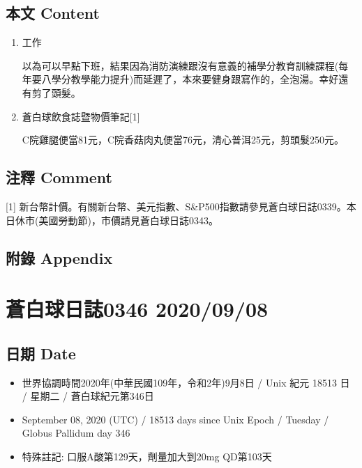 \documentclass[a5paper, 11pt
]{book}
\providecommand{\tightlist}{%
  \setlength{\itemsep}{0pt}\setlength{\parskip}{0pt}}
\begin{document}
\hypertarget{ux672cux6587-content-6}{%
\subsection{本文 Content}\label{ux672cux6587-content-6}}

\begin{enumerate}
\def\labelenumi{\arabic{enumi}.}
\item
  工作

  以為可以早點下班，結果因為消防演練跟沒有意義的補學分教育訓練課程(每年要八學分教學能力提升)而延遲了，本來要健身跟寫作的，全泡湯。幸好還有剪了頭髮。
\item
  蒼白球飲食誌暨物價筆記{[}1{]}

  C院雞腿便當81元，C院香菇肉丸便當76元，清心普洱25元，剪頭髮250元。
\end{enumerate}

\hypertarget{ux6ce8ux91cb-comment-6}{%
\subsection{注釋 Comment}\label{ux6ce8ux91cb-comment-6}}

{[}1{]}
新台幣計價。有關新台幣、美元指數、S\&P500指數請參見蒼白球日誌0339。本日休市(美國勞動節)，市價請見蒼白球日誌0343。

\hypertarget{ux9644ux9304-appendix-6}{%
\subsection{附錄 Appendix}\label{ux9644ux9304-appendix-6}}

\hypertarget{ux84bcux767dux7403ux65e5ux8a8c0346-20200908}{%
\section{蒼白球日誌0346
2020/09/08}\label{ux84bcux767dux7403ux65e5ux8a8c0346-20200908}}

\hypertarget{ux65e5ux671f-date-7}{%
\subsection{日期 Date}\label{ux65e5ux671f-date-7}}

\begin{itemize}
\tightlist
\item
  世界協調時間2020年(中華民國109年，令和2年)9月8日 / Unix 紀元 18513 日
  / 星期二 / 蒼白球紀元第346日
\item
  September 08, 2020 (UTC) / 18513 days since Unix Epoch / Tuesday /
  Globus Pallidum day 346
\item
  特殊註記: 口服A酸第129天，劑量加大到20mg QD第103天
\end{itemize}
\end{document}
